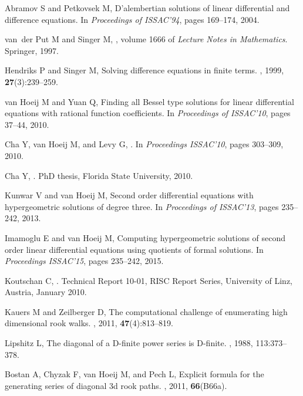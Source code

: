 \documentclass{jssc}
\begin{document}
\begin{thebibliography}{100}
 Abramov S and   Petkovsek M,
\newblock D'alembertian solutions of linear differential and difference
  equations.
\newblock In {\it Proceedings of ISSAC'94}, pages 169--174, 2004.

 van~der Put M and Singer M,
, volume 1666 of {\it
  Lecture Notes in Mathematics}.
\newblock Springer, 1997.

 Hendriks P and  Singer M,
\newblock Solving difference equations in finite terms.
, 1999, {\bf  27}(3):239--259.

  van Hoeij M and  Yuan Q,
\newblock Finding all {B}essel type solutions for linear differential equations
  with rational function coefficients.
\newblock In {\it Proceedings of ISSAC'10}, pages 37--44, 2010.

  Cha Y,  van Hoeij M, and   Levy G,
.
\newblock In {\it {Proceedings ISSAC'10}}, pages 303--309, 2010.

 Cha Y,
.
\newblock PhD thesis, Florida State University, 2010.

 Kunwar V and   van Hoeij M,
\newblock Second order differential equations with hypergeometric solutions of
  degree three.
\newblock In {\it Proceedings of ISSAC'13}, pages 235--242, 2013.

 Imamoglu E and van Hoeij M,
\newblock Computing hypergeometric solutions of second order linear
  differential equations using quotients of formal solutions.
\newblock In {\it Proceedings ISSAC'15}, pages 235--242, 2015.

 Koutschan C,
.
\newblock Technical Report 10-01, RISC Report Series, University of Linz,
  Austria, January 2010.

  Kauers M and  Zeilberger D,
\newblock The computational challenge of enumerating high dimensional rook
  walks.
, 2011, {\bf 47}(4):813--819.

 Lipshitz L,
\newblock The diagonal of a {D}-finite power series is {D}-finite.
, 1988, 113:373--378.

  Bostan A,  Chyzak F, van Hoeij M, and   Pech L,
\newblock Explicit formula for the generating series of diagonal 3d rook paths.
, 2011, {\bf 66}(B66a).


\end{thebibliography}
\end{document}
